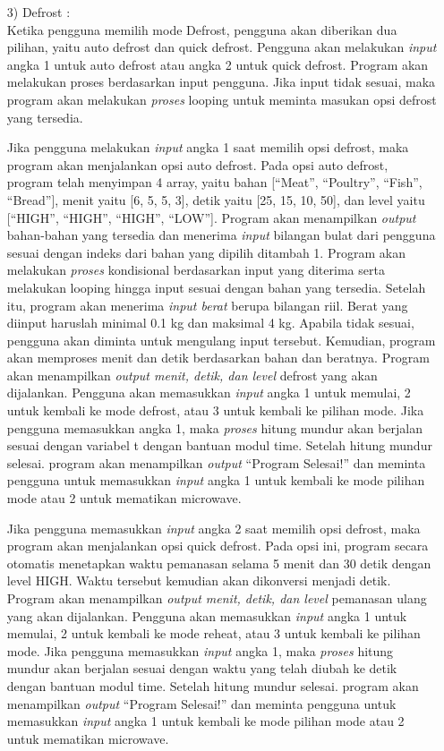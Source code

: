 \documentclass[conference]{IEEEtran}
\begin{document}
\begin{enumerate}
\item[3)] Defrost :\\
Ketika pengguna memilih mode Defrost, pengguna akan diberikan dua pilihan, yaitu auto defrost dan quick defrost. Pengguna akan melakukan \textit{input} angka 1 untuk auto defrost atau angka 2 untuk quick defrost. Program akan melakukan proses 
berdasarkan input pengguna. Jika input tidak sesuai, maka program akan melakukan \textit{proses} looping untuk meminta masukan opsi defrost yang tersedia. 

Jika pengguna melakukan \textit{input} angka 1 saat memilih opsi defrost, maka program akan menjalankan opsi auto defrost. Pada opsi auto defrost, program telah menyimpan 4 array, yaitu bahan [“Meat”, “Poultry”, “Fish”, “Bread”], menit yaitu [6, 5, 5, 3], detik yaitu [25, 15, 10, 50],
dan level yaitu [“HIGH”, “HIGH”, “HIGH”, “LOW”]. Program akan menampilkan \textit{output} bahan-bahan yang tersedia dan menerima \textit{input} bilangan bulat dari pengguna sesuai dengan indeks dari bahan yang dipilih ditambah 1. Program akan melakukan \textit{proses} kondisional berdasarkan input 
yang diterima serta melakukan looping hingga input sesuai dengan bahan yang tersedia. Setelah itu, program akan menerima \textit{input berat} berupa bilangan riil. Berat yang diinput haruslah minimal 0.1 kg dan maksimal 4 kg. Apabila tidak sesuai, pengguna 
akan diminta untuk mengulang input tersebut. Kemudian, program akan memproses menit dan detik berdasarkan bahan dan beratnya. Program akan menampilkan \textit{output menit, detik, dan level} defrost yang akan dijalankan. Pengguna akan memasukkan \textit{input} 
angka 1 untuk memulai, 2 untuk kembali ke mode defrost, atau 3 untuk kembali ke pilihan mode. Jika pengguna memasukkan angka 1, maka \textit{proses} hitung mundur akan berjalan sesuai dengan variabel t dengan bantuan modul time. Setelah hitung mundur selesai. 
program akan menampilkan \textit{output} “Program Selesai!” dan meminta pengguna untuk memasukkan \textit{input} angka 1 untuk kembali ke mode pilihan mode atau 2 untuk mematikan microwave.

Jika pengguna memasukkan \textit{input} angka 2 saat memilih opsi defrost, maka program akan menjalankan opsi quick defrost. Pada opsi ini, program secara otomatis menetapkan waktu pemanasan selama 5 menit dan 30 detik dengan level HIGH. Waktu 
tersebut kemudian akan dikonversi menjadi detik. Program akan menampilkan \textit{output menit, detik, dan level} pemanasan ulang yang akan dijalankan. Pengguna akan memasukkan \textit{input} angka 1 untuk memulai, 2 untuk kembali ke mode reheat, 
atau 3 untuk kembali ke pilihan mode. Jika pengguna memasukkan \textit{input} angka 1, maka \textit{proses} hitung mundur akan berjalan sesuai dengan waktu yang telah diubah ke detik dengan bantuan modul time. Setelah hitung mundur selesai. program 
akan menampilkan \textit{output} “Program Selesai!” dan meminta pengguna untuk memasukkan \textit{input} angka 1 untuk kembali ke mode pilihan mode atau 2 untuk mematikan microwave.



\end{enumerate}
\end{document}
